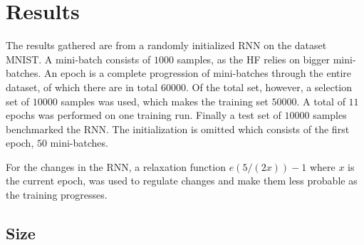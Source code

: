 \chapter{Results}

The results gathered are from a randomly initialized RNN on the dataset MNIST. A mini-batch consists of $1000$ samples, as the HF relies on bigger mini-batches. An epoch is a complete progression of mini-batches through the entire dataset, of which there are in total $60 000$. Of the total set, however, a selection set of $10 000$ samples was used, which makes the training set $50000$. A total of $11$ epochs was performed on one training run. Finally a test set of $10000$ samples benchmarked the RNN. The initialization is omitted which consists of the first epoch, $50$ mini-batches.

For the changes in the RNN, a relaxation function $e(5/(2x)) - 1$ where $x$ is the current epoch, was used to regulate changes and make them less probable as the training progresses.

\section{Size}

\section{}